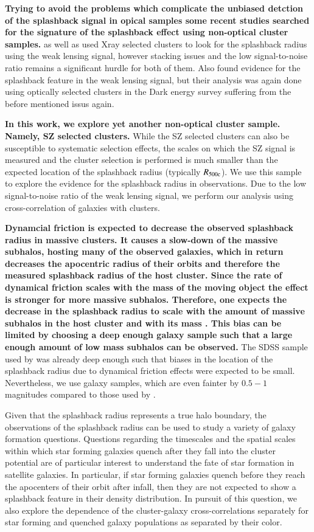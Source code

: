 \documentclass[iop, apjl, twocolappendix, numberedappendix]{emulateapj}
\begin{document}
\textbf{Trying to avoid the problems which complicate the unbiased detction
of the splashback signal in opical samples some recent studies searched
for the signature of the splashback effect using non-optical cluster samples.}
\citet{umetsu2017lensing} as well as \citet{contigiani2018weak}
used Xray selected clusters to look for the splashback radius
using the weak lensing signal, however stacking issues and the low
signal-to-noise ratio remains a significant hurdle for both of them.
Also \citet{chang2017splashback} found evidence for the splashback feature
in the weak lensing signal, but their analysis was again done using
optically selected clusters in the Dark energy survey suffering from 
the before mentioned issus again.

\textbf{In this work, we explore yet another non-optical cluster sample. 
Namely, SZ selected clusters.} While the SZ
selected clusters can also be susceptible to systematic selection
effects, the scales on which the SZ signal is measured and the
cluster selection is performed is much smaller than the expected
location of the splashback radius (typically $R_{\rm 500c}$). We use
this sample to explore the evidence for the splashback radius in
observations.  Due to the low signal-to-noise ratio of the weak
lensing signal, we perform our analysis using cross-correlation of
galaxies with clusters.  

\textbf{Dynamcial friction is expected to decrease the observed splashback radius in 
massive clusters. It causes a
slow-down of the massive subhalos, hosting many of the observed galaxies, 
which in return decreases the apocentric
radius of their orbits and therefore the measured splashback radius of the host cluster. 
Since the rate of dynamical friction scales
with the mass of the moving object the effect is stronger for more
massive subhalos. Therefore, one expects the decrease in the splashback
radius to scale with the amount of massive subhalos in the host cluster and
with its mass \citep{adhikari2016observing}. This bias can be limited by choosing a deep enough
galaxy sample such that a large enough amount of low mass subhalos can be
observed.} The SDSS sample used by
\citet{more2016detection} was already deep enough such that biases in the
location of the splashback radius due to dynamical friction effects
were expected to be small. 
Nevertheless, we use galaxy samples, which
are even fainter by $0.5-1$ magnitudes compared to those used by
\citet{more2016detection}.

Given that the splashback radius represents a true halo boundary,
the observations of the splashback radius can be used to study a
variety of galaxy formation questions. Questions regarding the
timescales and the spatial scales within which star forming galaxies
quench after they fall into the cluster potential are of particular
interest to understand the fate of star formation in satellite
galaxies. In particular, if star forming galaxies quench before they
reach the apocenters of their orbit after infall, then they are not
expected to show a splashback feature in their density distribution.
In pursuit of this question, we also explore the dependence of the
cluster-galaxy cross-correlations separately for star forming and
quenched galaxy populations as separated by their color.
\end{document}

